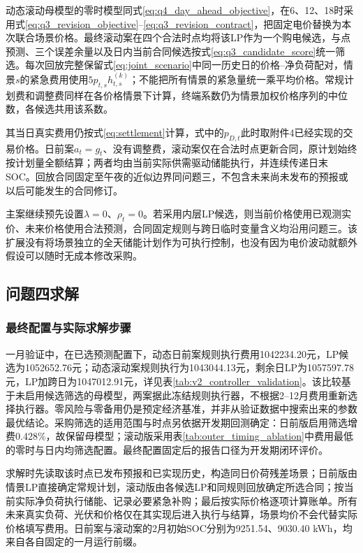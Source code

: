 动态滚动母模型的零时模型同式\eqref{eq:q4_day_ahead_objective}，在6、12、18时采用式\eqref{eq:q3_revision_objective}--\eqref{eq:q3_revision_contract}，把固定电价替换为本次联合场景价格。最终滚动案在四个合法时点均将该LP作为一个购电候选，与点预测、三个误差余量以及日内当前合同候选按式\eqref{eq:q3_candidate_score}统一筛选。每次回放完整保留式\eqref{eq:joint_scenario}中同一历史日的价格--净负荷配对，情景$s$的紧急费用使用$5p_{t,s}h_{t,s}^{(k)}$；不能把所有情景的紧急量统一乘平均价格。常规计划费和调整费同样在各价格情景下计算，终端系数仍为情景加权价格序列的中位数，各候选共用该系数。

其当日真实费用仍按式\eqref{eq:settlement}计算，式中的$p_{D,t}$此时取附件4已经实现的交易价格。日前案$a_t=g_t$、没有调整费，滚动案仅在合法时点更新合同，原计划始终按计划量全额结算；两者均由当前实际供需驱动储能执行，并连续传递日末SOC。回放合同固定至午夜的近似边界同问题三，不包含未来尚未发布的预报或以后可能发生的合同修订。

主案继续预先设置$\lambda=0$、$\rho_t=0$。若采用内层LP候选，则当前价格使用已观测实价、未来价格使用合法预测，合同固定规则与跨日临时变量含义均沿用问题三。该扩展没有将场景独立的全天储能计划作为可执行控制，也没有因为电价波动就额外假设可以随时无成本修改采购。

\subsection{问题四求解}

\subsubsection{最终配置与实际求解步骤}

一月验证中，在已选预测配置下，动态日前案规则执行费用1042234.20元，LP候选为1052652.76元；动态滚动案规则执行为1043044.13元，剩余日LP为1057597.78元，LP加跨日为1047012.91元，详见表\ref{tab:v2_controller_validation}。该比较基于未启用候选筛选的母模型，两案据此冻结规则执行器，不根据2--12月费用重新选择执行器。零风险与零备用仍是预定经济基准，并非从验证数据中搜索出来的参数最优结论。采购筛选的适用范围与时点另依据开发期回测确定：日前版启用筛选增费0.428\%，故保留母模型；滚动版采用表\ref{tab:outer_timing_ablation}中费用最低的零时与日内均筛选配置。最终配置固定后的报告口径为开发期闭环评价。

求解时先读取该时点已发布预报和已实现历史，构造同日价荷残差场景；日前版由情景LP直接确定常规计划，滚动版由各候选LP和同规则回放确定所选合同；按当前实际净负荷执行储能、记录必要紧急补购；最后按实际价格逐项计算账单。所有未来真实负荷、光伏和价格仅在其实现后进入执行与结算，场景均价不会代替实际价格填写费用。日前案与滚动案的2月初始SOC分别为9251.54、9030.40 kWh，均来自各自固定的一月运行前缀。

